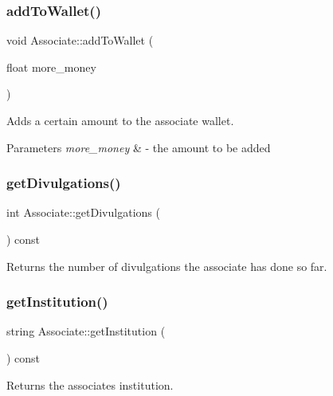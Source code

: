 \subsubsection{\texorpdfstring{add\+To\+Wallet()}{addToWallet()}}
{\footnotesize\ttfamily void Associate\+::add\+To\+Wallet (\begin{DoxyParamCaption}\item[{float}]{more\+\_\+money }\end{DoxyParamCaption})}



Adds a certain amount to the associate wallet. 


\begin{DoxyParams}{Parameters}
{\em more\+\_\+money} & -\/ the amount to be added \\
\hline
\end{DoxyParams}
\mbox{\label{classAssociate_a2ee36cec1d42559fdd1f9afe7ff85b2b}} 
\subsubsection{\texorpdfstring{get\+Divulgations()}{getDivulgations()}}
{\footnotesize\ttfamily int Associate\+::get\+Divulgations (\begin{DoxyParamCaption}{ }\end{DoxyParamCaption}) const}



Returns the number of divulgations the associate has done so far. 

\mbox{\label{classAssociate_acef0ddff899cbca55e3b19abc67f1800}} 
\subsubsection{\texorpdfstring{get\+Institution()}{getInstitution()}}
{\footnotesize\ttfamily string Associate\+::get\+Institution (\begin{DoxyParamCaption}{ }\end{DoxyParamCaption}) const}



Returns the associate\textquotesingle{}s institution. 

